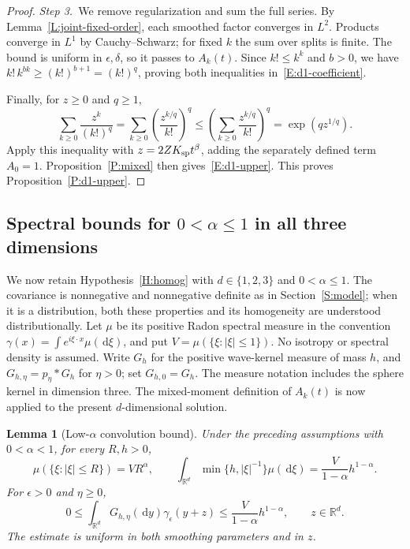 \documentclass[12pt,oneside,openany]{book}
\makeatletter
\let\lean@pending\@empty
\newcommand{\LeanMarker}[1]{\gdef\lean@pending{#1}}
\numberwithin{equation}{section}
\newtheorem{lemma}[theorem]{Lemma}
\theoremstyle{nogostyle}
\theoremstyle{definition}
\newcommand{\R}{\mathbb{R}}
\newcommand{\ud}{\,\mathrm{d}}
\makeatother
\begin{document}
\begin{proof}
  \medskip
  \noindent\textit{Step 3.~}We remove regularization and sum the full series.
  By Lemma~\ref{L:joint-fixed-order}, each smoothed factor converges in $L^2$.
  Products converge in $L^1$ by Cauchy--Schwarz; for fixed $k$ the sum over
  splits is finite. The bound is uniform in $\epsilon,\delta$, so it passes to
  $A_k(t)$. Since $k! \le k^k$ and $b > 0$, we have $k!\,k^{bk} \ge (k!)^{b+1} =
  (k!)^q$, proving both inequalities in~\eqref{E:d1-coefficient}.

  Finally, for $z \ge 0$ and $q \ge 1$,
  \[
    \sum_{k\ge0}\frac{z^k}{(k!)^q}
    =\sum_{k\ge0}\left(\frac{z^{k/q}}{k!}\right)^q
    \le\left(\sum_{k\ge0}\frac{z^{k/q}}{k!}\right)^q
    =\exp(qz^{1/q}).
  \]
  Apply this inequality with $z = 2ZK_{\rm sp}t^\beta$, adding the separately
  defined term $A_0 = 1$. Proposition~\ref{P:mixed} then
  gives~\eqref{E:d1-upper}. This proves Proposition~\ref{P:d1-upper}.
\end{proof}

\subsection{Spectral bounds for $0 < \alpha \le 1$ in all three dimensions}

We now retain Hypothesis~\ref{H:homog} with $d \in \{1,2,3\}$ and $0 < \alpha
\le 1$. The covariance is nonnegative and nonnegative definite as in
Section~\ref{S:model}; when it is a distribution, both these properties and its
homogeneity are understood distributionally. Let $\mu$ be its positive Radon
spectral measure in the convention $\gamma(x) = \int e^{i\xi\cdot
x}\mu(\ud\xi)$, and put $V = \mu(\{\xi:|\xi|\le1\})$. No isotropy or spectral
density is assumed. Write $G_h$ for the positive wave-kernel measure of mass
$h$, and $G_{h,\eta} = p_\eta*G_h$ for $\eta > 0$; set $G_{h,0} = G_h$. The
measure notation includes the sphere kernel in dimension three. The mixed-moment
definition of $A_k(t)$ is now applied to the present $d$-dimensional solution.

\LeanMarker{L:low-alpha-convolution}
\begin{lemma}[Low-$\alpha$ convolution bound]\label{L:low-alpha-convolution}
  Under the preceding assumptions with $0 < \alpha < 1$, for every $R,h > 0$,
  \begin{equation}\label{E:low-alpha-radial}
    \mu(\{\xi:|\xi|\le R\})=VR^\alpha,\qquad
    \int_{\R^d}\min\{h,|\xi|^{-1}\}\mu(\ud\xi)
    =\frac{V}{1-\alpha}h^{1-\alpha}.
  \end{equation}
  For $\epsilon > 0$ and $\eta \ge 0$,
  \begin{equation}\label{E:low-alpha-convolution}
    0\le\int_{\R^d}G_{h,\eta}(\ud y)\gamma_\epsilon(y+z)
    \le\frac{V}{1-\alpha}h^{1-\alpha},
    \qquad z\in\R^d.
  \end{equation}
  The estimate is uniform in both smoothing parameters and in $z$.
\end{lemma}
\end{document}
